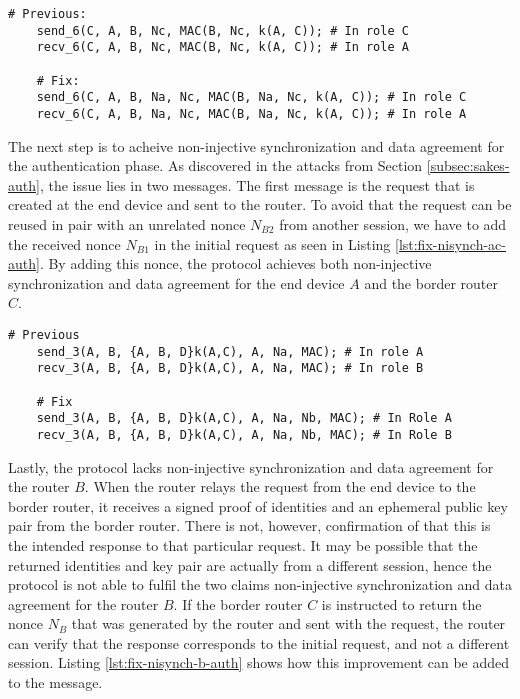 \newpage

\begin{lstlisting}[caption={Fix to the SAKES protocol to provide weak agreement for the end device in the authentication phase.}, label={lst:fix-weakagree-auth}]
	# Previous:
	send_6(C, A, B, Nc, MAC(B, Nc, k(A, C)); # In role C
	recv_6(C, A, B, Nc, MAC(B, Nc, k(A, C)); # In role A
	
	# Fix:
	send_6(C, A, B, Na, Nc, MAC(B, Na, Nc, k(A, C)); # In role C
	recv_6(C, A, B, Na, Nc, MAC(B, Na, Nc, k(A, C)); # In role A
\end{lstlisting}

The next step is to acheive non-injective synchronization and data agreement for the authentication phase. As discovered in the attacks from Section \ref{subsec:sakes-auth}, the issue lies in two messages. The first message is the request that is created at the end device and sent to the router. To avoid that the request can be reused in pair with an unrelated nonce $N_{B2}$ from another session, we have to add the received nonce $N_{B1}$ in the initial request as seen in Listing \ref{lst:fix-nisynch-ac-auth}. By adding this nonce, the protocol achieves both non-injective synchronization and data agreement for the end device $A$ and the border router $C$.\\

\begin{lstlisting}[caption={Fix to the SAKES protocol to provide non-injective synchronization and data agreement for the end device and the border router during the authentication phase.}, label={lst:fix-nisynch-ac-auth}]
	# Previous
	send_3(A, B, {A, B, D}k(A,C), A, Na, MAC); # In role A
	recv_3(A, B, {A, B, D}k(A,C), A, Na, MAC); # In role B

	# Fix
	send_3(A, B, {A, B, D}k(A,C), A, Na, Nb, MAC); # In Role A
	recv_3(A, B, {A, B, D}k(A,C), A, Na, Nb, MAC); # In Role B
\end{lstlisting}


Lastly, the protocol lacks non-injective synchronization and data agreement for the router $B$. When the router relays the request from the end device to the border router, it receives a signed proof of identities and an ephemeral public key pair from the border router. There is not, however, confirmation of that this is the intended response to that particular request. It may be possible that the returned identities and key pair are actually from a different session, hence the protocol is not able to fulfil the two claims non-injective synchronization and data agreement for the router $B$. If the border router $C$ is instructed to return the nonce $N_B$ that was generated by the router and sent with the request, the router can verify that the response corresponds to the initial request, and not a different session. Listing \ref{lst:fix-nisynch-b-auth} shows how this improvement can be added to the message.\\

